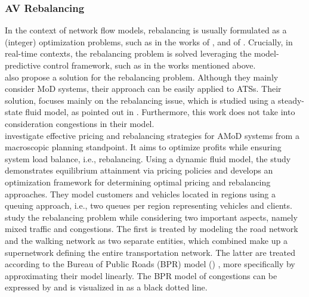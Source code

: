 \subsubsection*{AV Rebalancing}
In the context of network flow models, rebalancing is usually formulated as a (integer) optimization problems, such as in the works of ,  and of . Crucially, in real-time contexts, the rebalancing problem is solved leveraging the model-predictive control framework, such as in the works mentioned above. \\
 also propose a solution for the rebalancing problem. Although they mainly consider MoD systems, their approach can be easily applied to ATSs. Their solution, focuses mainly on the rebalancing issue, which is studied using a steady-state fluid model, as pointed out in \cite{9294258}. Furthermore, this work does not take into consideration congestions in their model. \\
 investigate effective pricing and rebalancing strategies for AMoD systems from a macroscopic planning standpoint. It aims to optimize profits while ensuring system load balance, i.e., rebalancing. Using a dynamic fluid model, the study demonstrates equilibrium attainment via pricing policies and develops an optimization framework for determining optimal pricing and rebalancing approaches. They model customers and vehicles located in regions using a queuing approach, i.e., two queues per region representing vehicles and clients. \\
 study the rebalancing problem while considering two important aspects, namely mixed traffic and congestions. The first is treated by modeling the road network and the walking network as two separate entities, which combined make up a supernetwork defining the entire transportation network. The latter are treated according to the Bureau of Public Roads (BPR) model (\cite{BPR1964}) , more specifically by approximating their model linearly. The BPR model of congestions can be expressed by  and is visualized in  as a black dotted line. 
